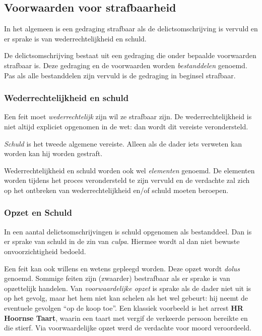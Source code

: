 \documentclass{article}
\begin{document}
\subsection{Voorwaarden voor strafbaarheid}

In het algemeen is een gedraging strafbaar als de delictsomschrijving is
vervuld en er sprake is van wederrechtelijkheid en schuld.

De delictsomschrijving bestaat uit een gedraging die onder bepaalde voorwaarden
strafbaar is. Deze gedraging en de voorwaarden worden \emph{bestanddelen} genoemd.
Pas als alle bestanddelen zijn vervuld is de gedraging in beginsel strafbaar.

\subsubsection{Wederrechtelijkheid en schuld}

Een feit moet \emph{wederrechtelijk} zijn wil ze strafbaar zijn. De
wederrechtelijkheid is niet altijd expliciet opgenomen in de wet: dan wordt dit
vereiste verondersteld.

\emph{Schuld} is het tweede algemene vereiste. Alleen als de dader iets verweten
kan worden kan hij worden gestraft.

Wederrechtelijkheid en schuld worden ook wel \emph{elementen} genoemd. De
elementen worden tijdens het proces verondersteld te zijn vervuld en de
verdachte zal zich op het ontbreken van wederrechtelijkheid en/of schuld
moeten beroepen.

\subsubsection{Opzet en Schuld}

In een aantal delictsomschrijvingen is schuld opgenomen als bestanddeel. Dan is
er sprake van schuld in de zin van \emph{culpa}. Hiermee wordt al dan niet
bewuste onvoorzichtigheid bedoeld.

Een feit kan ook willens en wetens gepleegd worden. Deze opzet wordt
\emph{dolus} genoemd. Sommige feiten zijn (zwaarder) bestrafbaar als er sprake
is van opzettelijk handelen. Van \emph{voorwaardelijke opzet} is sprake als de
dader niet uit is op het gevolg, maar het hem niet kan schelen als het wel
gebeurt: hij neemt de eventuele gevolgen ``op de koop toe''. Een klassiek voorbeeld
is het arrest \textbf{HR Hoornse Taart}, waarin een taart met vergif de verkeerde
persoon bereikte en die stierf. Via voorwaardelijke opzet werd de verdachte voor
moord veroordeeld.
\end{document}
